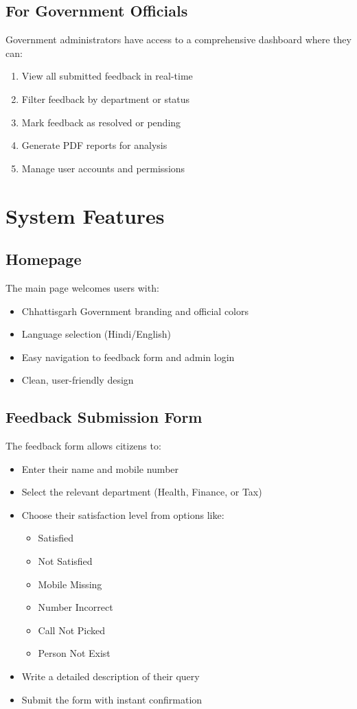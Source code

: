 \documentclass[12pt,a4paper]{article}
\begin{document}
\subsection{For Government Officials}
Government administrators have access to a comprehensive dashboard where they can:
\begin{enumerate}
    \item View all submitted feedback in real-time
    \item Filter feedback by department or status
    \item Mark feedback as resolved or pending
    \item Generate PDF reports for analysis
    \item Manage user accounts and permissions
\end{enumerate}

\section{System Features}

\subsection{Homepage}
The main page welcomes users with:
\begin{itemize}
    \item Chhattisgarh Government branding and official colors
    \item Language selection (Hindi/English)
    \item Easy navigation to feedback form and admin login
    \item Clean, user-friendly design
\end{itemize}

\subsection{Feedback Submission Form}
The feedback form allows citizens to:
\begin{itemize}
    \item Enter their name and mobile number
    \item Select the relevant department (Health, Finance, or Tax)
    \item Choose their satisfaction level from options like:
    \begin{itemize}
        \item Satisfied
        \item Not Satisfied
        \item Mobile Missing
        \item Number Incorrect
        \item Call Not Picked
        \item Person Not Exist
    \end{itemize}
    \item Write a detailed description of their query
    \item Submit the form with instant confirmation
\end{itemize}
\end{document}
